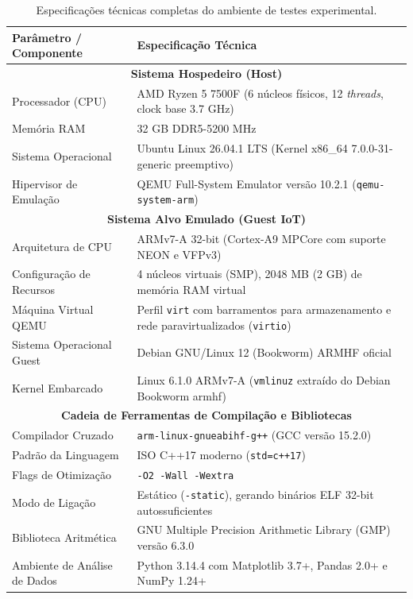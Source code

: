 \begin{table}[htbp]
\centering
\caption{Especificações técnicas completas do ambiente de testes experimental.}
\label{tab:especificacoes_ambiente}
\begin{tabular}{ll}
\hline
\textbf{Parâmetro / Componente} & \textbf{Especificação Técnica} \\
\hline
\multicolumn{2}{c}{\textbf{Sistema Hospedeiro (Host)}} \\
\hline
Processador (CPU) & AMD Ryzen 5 7500F (6 núcleos físicos, 12 \textit{threads}, clock base 3.7 GHz) \\
Memória RAM & 32 GB DDR5-5200 MHz \\
Sistema Operacional & Ubuntu Linux 26.04.1 LTS (Kernel x86\_64 7.0.0-31-generic preemptivo) \\
Hipervisor de Emulação & QEMU Full-System Emulator versão 10.2.1 (\texttt{qemu-system-arm}) \\
\hline
\multicolumn{2}{c}{\textbf{Sistema Alvo Emulado (Guest IoT)}} \\
\hline
Arquitetura de CPU & ARMv7-A 32-bit (Cortex-A9 MPCore com suporte NEON e VFPv3) \\
Configuração de Recursos & 4 núcleos virtuais (SMP), 2048 MB (2 GB) de memória RAM virtual \\
Máquina Virtual QEMU & Perfil \texttt{virt} com barramentos para armazenamento e rede paravirtualizados (\texttt{virtio}) \\
Sistema Operacional Guest & Debian GNU/Linux 12 (Bookworm) ARMHF oficial \\
Kernel Embarcado & Linux 6.1.0 ARMv7-A (\texttt{vmlinuz} extraído do Debian Bookworm armhf) \\
\hline
\multicolumn{2}{c}{\textbf{Cadeia de Ferramentas de Compilação e Bibliotecas}} \\
\hline
Compilador Cruzado & \texttt{arm-linux-gnueabihf-g++} (GCC versão 15.2.0) \\
Padrão da Linguagem & ISO C++17 moderno (\texttt{std=c++17}) \\
Flags de Otimização & \texttt{-O2 -Wall -Wextra} \\
Modo de Ligação & Estático (\texttt{-static}), gerando binários ELF 32-bit autossuficientes \\
Biblioteca Aritmética & GNU Multiple Precision Arithmetic Library (GMP) versão 6.3.0 \\
Ambiente de Análise de Dados & Python 3.14.4 com Matplotlib 3.7+, Pandas 2.0+ e NumPy 1.24+ \\
\hline
\end{tabular}
\end{table}

